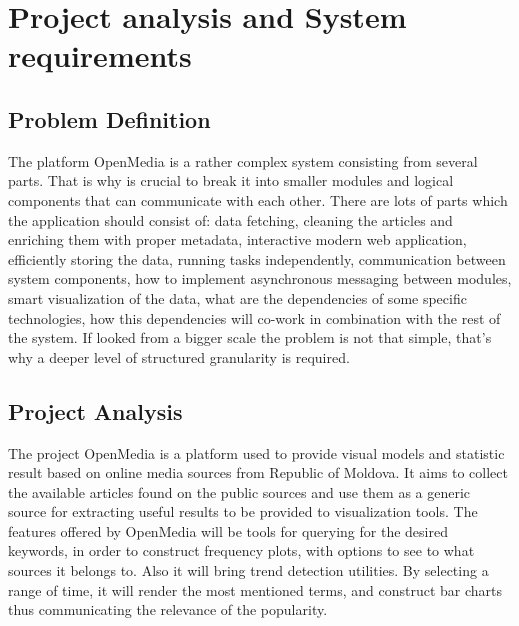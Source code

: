\section{Project analysis and System requirements}

\subsection{Problem Definition}
The platform OpenMedia is a rather complex system consisting from several parts. That is why is crucial to break it into smaller modules and logical components that can communicate with each other. There are lots of parts which the application should consist of: data fetching, cleaning the articles and enriching them with proper metadata, interactive modern web application, efficiently storing the data, running tasks independently, communication between system components, how to implement asynchronous messaging between modules, smart visualization of the data, what are the dependencies of some specific technologies, how this dependencies will co-work in combination with the rest of the system. If looked from a bigger scale the problem is not that simple, that's why a deeper level of structured granularity is required.

\subsection{Project Analysis}
The project OpenMedia is a platform used to provide visual models and statistic result based on online media sources from Republic of Moldova. It aims to collect the available articles found on the public sources and use them as a generic source for extracting useful results to be provided to visualization tools. The features offered by OpenMedia will be tools for querying for the desired keywords, in order to construct frequency plots, with options to see to what sources it belongs to. Also it will bring trend detection utilities. By selecting a range of time, it will render the most mentioned terms, and construct bar charts thus communicating the relevance of the popularity.

